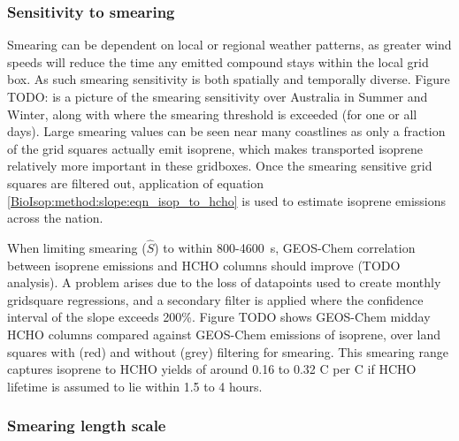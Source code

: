       

    \subsubsection{Sensitivity to smearing}
    
      Smearing can be dependent on local or regional weather patterns, as greater wind speeds will reduce the time any emitted compound stays within the local grid box.
      As such smearing sensitivity is both spatially and temporally diverse.
      Figure TODO: is a picture of the smearing sensitivity over Australia in Summer and Winter, along with where the smearing threshold is exceeded (for one or all days).
      Large smearing values can be seen near many coastlines as only a fraction of the grid squares actually emit isoprene, which makes transported isoprene relatively more important in these gridboxes.
      Once the smearing sensitive grid squares are filtered out, application of equation \ref{BioIsop:method:slope:eqn_isop_to_hcho} is used to estimate isoprene emissions across the nation.
      
      
      
      When limiting smearing ($\hat{S}$) to within 800-4600~s, GEOS-Chem correlation between isoprene emissions and HCHO columns should improve (TODO analysis). 
      A problem arises due to the loss of datapoints used to create monthly gridsquare regressions, and a secondary filter is applied where the confidence interval of the slope exceeds 200\%.
      Figure TODO shows GEOS-Chem midday HCHO columns compared against GEOS-Chem emissions of isoprene, over land squares with (red) and without (grey) filtering for smearing.
      This smearing range captures isoprene to HCHO yields of around 0.16 to 0.32 C per C if HCHO lifetime is assumed to lie within 1.5 to 4 hours.
    
    \subsubsection{Smearing length scale}
    
